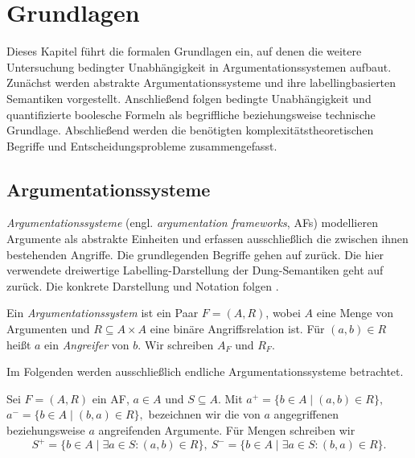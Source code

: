 \chapter{Grundlagen}
\label{ch:grundlagen}
Dieses Kapitel führt die formalen Grundlagen ein, auf denen die weitere
Untersuchung bedingter Unabhängigkeit in Argumentationssystemen aufbaut.
Zunächst werden abstrakte Argumentationssysteme und ihre labellingbasierten
Semantiken vorgestellt. Anschließend folgen bedingte Unabhängigkeit und
quantifizierte boolesche Formeln als begriffliche beziehungsweise technische
Grundlage. Abschließend werden die benötigten komplexitätstheoretischen
Begriffe und Entscheidungsprobleme zusammengefasst.
\section{Argumentationssysteme}
\label{sec:af}
\emph{Argumentationssysteme} (engl. \emph{argumentation frameworks}, AFs)
modellieren Argumente als abstrakte Einheiten und erfassen ausschließlich die
zwischen ihnen bestehenden Angriffe. Die grundlegenden Begriffe gehen auf 
\textcite{dung:1995:af} zurück.
Die hier verwendete dreiwertige Labelling-Darstellung der Dung-Semantiken
geht auf \textcite{caminada:2006:reinstatement} zurück. Die konkrete
Darstellung und Notation folgen
\citeauthor*{bluemel:2025:independence-aba}
\cite{bluemel:2025:independence-aba}.

\begin{Definition}[Argumentationssysteme]
    \label{def:af}
    Ein \emph{Argumentationssystem} ist ein Paar \(F=(A,R)\), wobei \(A\)
    eine Menge von Argumenten und \(R\subseteq A\times A\) eine
    binäre Angriffsrelation ist. Für \((a,b)\in R\) heißt \(a\) ein
    \emph{Angreifer} von \(b\). Wir schreiben \(A_F\) und \(R_F\).
\end{Definition}
Im Folgenden werden ausschließlich endliche Argumentationssysteme betrachtet.
\begin{Definition}[Angriffsnotation]
    \label{def:attack/defense}
    Sei \(F = (A,R)\) ein AF, \(a \in A\) und \(S \subseteq A\).     
    Mit
    \(
        a^+ = \{b\in A \mid (a,b)\in R\},
    \)
    \(
        a^- = \{b\in A \mid (b,a)\in R\},
    \)
    bezeichnen wir die von \(a\) angegriffenen beziehungsweise \(a\) angreifenden Argumente. 
    Für Mengen schreiben wir
    \[
        S^+ = \{b\in A \mid \exists a\in S\colon (a,b)\in R\},~
        S^- = \{b\in A \mid \exists a\in S\colon (b,a)\in R\}.
    \]
\end{Definition}

